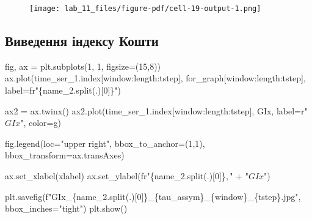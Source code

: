 \documentclass[
  letterpaper,
]{report}
\newenvironment{Shaded}{\begin{snugshade}}{\end{snugshade}}
\newcommand{\DecValTok}[1]{\textcolor[rgb]{0.68,0.00,0.00}{#1}}
\newcommand{\NormalTok}[1]{\textcolor[rgb]{0.00,0.23,0.31}{#1}}
\newcommand{\OperatorTok}[1]{\textcolor[rgb]{0.37,0.37,0.37}{#1}}
\newcommand{\SpecialCharTok}[1]{\textcolor[rgb]{0.37,0.37,0.37}{#1}}
\newcommand{\SpecialStringTok}[1]{\textcolor[rgb]{0.13,0.47,0.30}{#1}}
\newcommand{\StringTok}[1]{\textcolor[rgb]{0.13,0.47,0.30}{#1}}
\newcommand{\VerbatimStringTok}[1]{\textcolor[rgb]{0.13,0.47,0.30}{#1}}
\begin{document}
\begin{figure}[H]

{\centering \texttt{[image: lab\_11\_files/figure-pdf/cell-19-output-1.png]}

}

\end{figure}

\hypertarget{ux432ux438ux432ux435ux434ux435ux43dux43dux44f-ux456ux43dux434ux435ux43aux441ux443-ux43aux43eux448ux442ux438}{%
\subsection{Виведення індексу
Кошти}\label{ux432ux438ux432ux435ux434ux435ux43dux43dux44f-ux456ux43dux434ux435ux43aux441ux443-ux43aux43eux448ux442ux438}}

\begin{Shaded}
\begin{Highlighting}[]
\NormalTok{fig, ax }\OperatorTok{=}\NormalTok{ plt.subplots(}\DecValTok{1}\NormalTok{, }\DecValTok{1}\NormalTok{, figsize}\OperatorTok{=}\NormalTok{(}\DecValTok{15}\NormalTok{,}\DecValTok{8}\NormalTok{))}
\NormalTok{ax.plot(time\_ser\_1.index[window:length:tstep], for\_graph[window:length:tstep], label}\OperatorTok{=}\VerbatimStringTok{fr"}\SpecialCharTok{\{}\NormalTok{name\_2}\SpecialCharTok{.}\NormalTok{split(}\StringTok{\textquotesingle{}.\textquotesingle{}}\NormalTok{)[}\DecValTok{0}\NormalTok{]}\SpecialCharTok{\}}\VerbatimStringTok{"}\NormalTok{)}

\NormalTok{ax2 }\OperatorTok{=}\NormalTok{ ax.twinx()}
\NormalTok{ax2.plot(time\_ser\_1.index[window:length:tstep], GIx, label}\OperatorTok{=}\VerbatimStringTok{r"$ GIx $"}\NormalTok{, color}\OperatorTok{=}\StringTok{\textquotesingle{}g\textquotesingle{}}\NormalTok{)}

\NormalTok{fig.legend(loc}\OperatorTok{=}\StringTok{"upper right"}\NormalTok{, bbox\_to\_anchor}\OperatorTok{=}\NormalTok{(}\DecValTok{1}\NormalTok{,}\DecValTok{1}\NormalTok{), bbox\_transform}\OperatorTok{=}\NormalTok{ax.transAxes)}

\NormalTok{ax.set\_xlabel(xlabel)}
\NormalTok{ax.set\_ylabel(}\VerbatimStringTok{fr"}\SpecialCharTok{\{}\NormalTok{name\_2}\SpecialCharTok{.}\NormalTok{split(}\StringTok{\textquotesingle{}.\textquotesingle{}}\NormalTok{)[}\DecValTok{0}\NormalTok{]}\SpecialCharTok{\}}\VerbatimStringTok{$,$"} \OperatorTok{+} \StringTok{"$GIx$"}\NormalTok{)}

\NormalTok{plt.savefig(}\SpecialStringTok{f"GIx\_}\SpecialCharTok{\{}\NormalTok{name\_2}\SpecialCharTok{.}\NormalTok{split(}\StringTok{\textquotesingle{}.\textquotesingle{}}\NormalTok{)[}\DecValTok{0}\NormalTok{]}\SpecialCharTok{\}}\SpecialStringTok{\_}\SpecialCharTok{\{}\NormalTok{tau\_assym}\SpecialCharTok{\}}\SpecialStringTok{\_}\SpecialCharTok{\{}\NormalTok{window}\SpecialCharTok{\}}\SpecialStringTok{\_}\SpecialCharTok{\{}\NormalTok{tstep}\SpecialCharTok{\}}\SpecialStringTok{.jpg"}\NormalTok{, bbox\_inches}\OperatorTok{=}\StringTok{"tight"}\NormalTok{)}
\NormalTok{plt.show()}
\end{Highlighting}
\end{Shaded}
\end{document}
